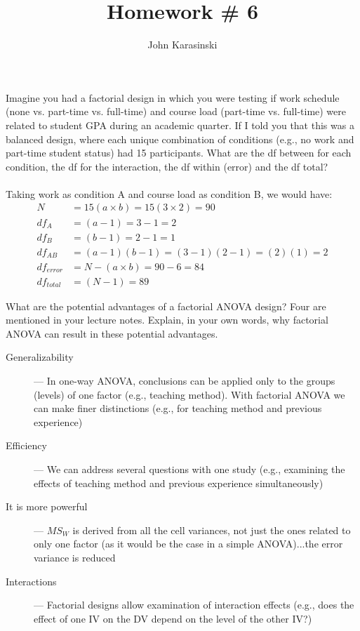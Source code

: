 \documentclass[onecolumn,10pt]{jhwhw}
\author{John Karasinski}
\title{Homework \# 6}
\begin{document}

\problem{}
Imagine you had a factorial design in which you were testing if work schedule (none vs. part-time vs. full-time) and course load (part-time vs. full-time) were related to student GPA during an academic quarter. If I told you that this was a balanced design, where each unique combination of conditions (e.g., no work and part-time student status) had 15 participants. What are the df between for each condition, the df for the interaction, the df within (error) and the df total?\\
\\
Taking work as condition A and course load as condition B, we would have:
\begin{align*}
N &= 15 (a \times b) = 15 (3 \times 2) = 90\\
df_A &= (a - 1) = 3 - 1 = 2\\
df_B &= (b - 1) = 2 - 1 = 1\\
df_{AB} &= (a-1)(b-1) = (3-1)(2-1) = (2)(1) = 2\\
df_{error} &= N - (a \times b) = 90 - 6 = 84\\
df_{total} &= (N - 1) = 89
\end{align*}


\problem{}
What are the potential advantages of a factorial ANOVA design? Four are mentioned in your lecture notes. Explain, in your own words, why factorial ANOVA can result in these potential advantages.

\begin{description}
\item[Generalizability] --- In one-way ANOVA, conclusions can be applied only to the groups (levels) of one factor (e.g., teaching method). With factorial ANOVA we can make finer distinctions (e.g., for teaching method and previous experience)
\item[Efficiency] --- We can address several questions with one study (e.g., examining the effects of teaching method and previous experience simultaneously)
\item[It is more powerful] --- $MS_W$ is derived from all the cell variances, not just the ones related to only one factor (as it would be the case in a simple ANOVA)...the error variance is
reduced
\item[Interactions] --- Factorial designs allow examination of interaction effects (e.g., does the effect of one IV on the DV depend on the level of the other IV?)
\end{description}
\end{document}
